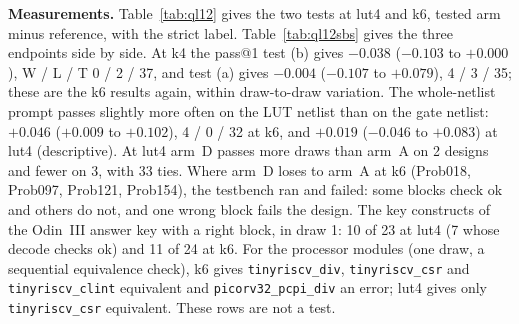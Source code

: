 \documentclass[conference]{IEEEtran}
\newcommand{\hev}[1]{\par\smallskip\noindent\textbf{#1}}
\newcommand{\code}[1]{\texttt{#1}}
\begin{document}
\hev{Measurements.} Table~\ref{tab:ql12} gives the two tests at lut4 and k6, tested arm minus reference, with the strict label. Table~\ref{tab:ql12sbs} gives the three endpoints side by side. At k4 the pass@1 test (b) gives $-0.038$ ($-0.103$ to $+0.000$), W / L / T 0 / 2 / 37, and test (a) gives $-0.004$ ($-0.107$ to $+0.079$), 4 / 3 / 35; these are the k6 results again, within draw-to-draw variation. The whole-netlist prompt passes slightly more often on the LUT netlist than on the gate netlist: $+0.046$ ($+0.009$ to $+0.102$), 4 / 0 / 32 at k6, and $+0.019$ ($-0.046$ to $+0.083$) at lut4 (descriptive). At lut4 arm~D passes more draws than arm~A on 2 designs and fewer on 3, with 33 ties. Where arm~D loses to arm~A at k6 (Prob018, Prob097, Prob121, Prob154), the testbench ran and failed: some blocks check ok and others do not, and one wrong block fails the design. The key constructs of the Odin~III answer key with a right block, in draw 1: 10 of 23 at lut4 (7 whose decode checks ok) and 11 of 24 at k6. For the processor modules (one draw, a sequential equivalence check), k6 gives \code{tinyriscv\_div}, \code{tinyriscv\_csr} and \code{tinyriscv\_clint} equivalent and \code{picorv32\_pcpi\_div} an error; lut4 gives only \code{tinyriscv\_csr} equivalent. These rows are not a test.
\end{document}

